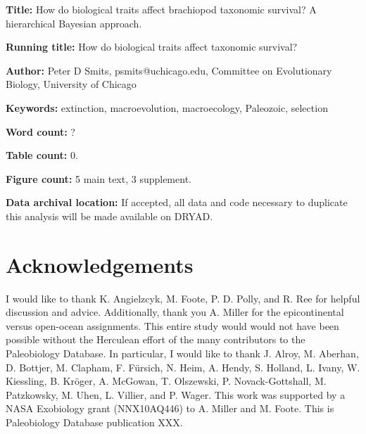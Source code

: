 \documentclass{article}
\begin{document}
\linenumbers
\modulolinenumbers[2]


\begin{titlepage}
  \begin{large}
    \textbf{Title:} How do biological traits affect brachiopod taxonomic survival? A hierarchical Bayesian approach.
  \end{large}

  \textbf{Running title:} How do biological traits affect taxonomic survival?

  \textbf{Author:} Peter D Smits, psmits@uchicago.edu, Committee on Evolutionary Biology, University of Chicago

  \textbf{Keywords:} extinction, macroevolution, macroecology, Paleozoic, selection

  \textbf{Word count:} ?
  
  \textbf{Table count:} 0.
 
  \textbf{Figure count:} 5 main text, 3 supplement.

  \textbf{Data archival location:} If accepted, all data and code necessary to duplicate this analysis will be made available on DRYAD.

\end{titlepage}











\section*{Acknowledgements}
I would like to thank K. Angielzcyk, M. Foote, P. D. Polly, and R. Ree for helpful discussion and advice. Additionally, thank you A. Miller for the epicontinental versus open-ocean assignments. This entire study would would not have been possible without the Herculean effort of the many contributors to the Paleobiology Database. In particular, I would like to thank J. Alroy, M. Aberhan, D. Bottjer, M. Clapham, F. F\"{u}rsich, N. Heim, A. Hendy, S. Holland, L. Ivany, W. Kiessling, B. Kr\"{o}ger, A. McGowan, T. Olszewski, P. Novack-Gottshall, M. Patzkowsky, M. Uhen, L. Villier, and P. Wager. This work was supported by a NASA Exobiology grant (NNX10AQ446) to A. Miller and M. Foote. This is Paleobiology Database publication XXX.

\clearpage




\clearpage

\appendix

\end{document}
